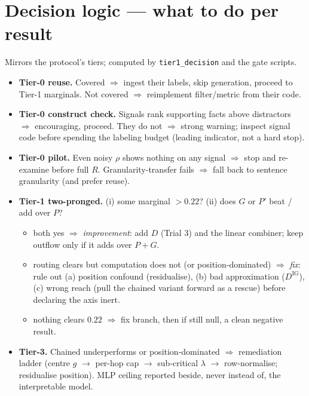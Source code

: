 \documentclass[11pt]{article}
\begin{document}
\section{Decision logic --- what to do per result}
\label{sec:decisions}
Mirrors the protocol's tiers; computed by \texttt{tier1\_decision} and the gate scripts.
\begin{itemize}
\item \textbf{Tier-0 reuse.} Covered $\Rightarrow$ ingest their labels, skip generation, proceed to
Tier-1 marginals. Not covered $\Rightarrow$ reimplement filter/metric from their code.
\item \textbf{Tier-0 construct check.} Signals rank supporting facts above distractors $\Rightarrow$
encouraging, proceed. They do not $\Rightarrow$ strong warning; inspect signal code before spending the
labeling budget (leading indicator, not a hard stop).
\item \textbf{Tier-0 pilot.} Even noisy $\rho$ shows nothing on any signal $\Rightarrow$ stop and
re-examine before full $R$. Granularity-transfer fails $\Rightarrow$ fall back to sentence granularity
(and prefer reuse).
\item \textbf{Tier-1 two-pronged.} (i) some marginal $>0.22$? (ii) does $G$ or $P'$ beat / add over $P$?
\begin{itemize}
\item both yes $\Rightarrow$ \emph{improvement}: add $D$ (Trial 3) and the linear combiner; keep outflow
only if it adds over $P{+}G$.
\item routing clears but computation does not (or position-dominated) $\Rightarrow$ \emph{fix}: rule out
(a) position confound (residualise), (b) bad approximation ($D^{\mathrm{IG}}$), (c) wrong reach (pull the
chained variant forward as a rescue) before declaring the axis inert.
\item nothing clears $0.22$ $\Rightarrow$ fix branch, then if still null, a clean negative result.
\end{itemize}
\item \textbf{Tier-3.} Chained underperforms or position-dominated $\Rightarrow$ remediation ladder
(centre $g$ $\to$ per-hop cap $\to$ sub-critical $\lambda$ $\to$ row-normalise; residualise position).
MLP ceiling reported beside, never instead of, the interpretable model.
\end{itemize}
\end{document}
